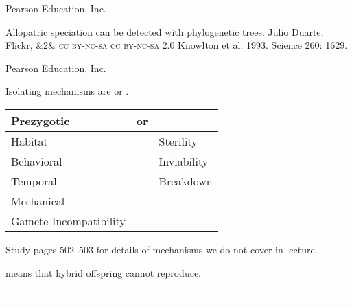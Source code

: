 \documentclass[t]{beamer}
\newcommand{\ccbyncsa}[1]{%
	\ifx&#1&
	{\textsc{cc by-nc-sa}}%
\else
	{\textsc{cc by-nc-sa #1.0}}
\fi}
\begin{document}
{
\begin{frame}[b]
\hfill \tiny \textcopyright Pearson Education, Inc.
\end{frame}
}

{
\begin{frame}[b]{Allopatric speciation can be detected with phylogenetic trees.}
\tiny  Julio Duarte, Flickr, \ccbyncsa{2} \hfill Knowlton et al. 1993. Science 260: 1629.
\end{frame}
}

{
\begin{frame}[b]
\tiny  \textcopyright Pearson Education, Inc.
\end{frame}
}

\begin{frame}{Isolating mechanisms are  or .}
	\vspace{2\baselineskip}
	\centering
	\begin{tabular}{l l l}
	\toprule
	{\large Prezygotic}	& or &	{\large \highlight{Postzygotic}}\\
	\midrule
	Habitat	& & Sterility \\
	Behavioral & &	Inviability \\
	Temporal	& &	Breakdown \\
	Mechanical 	& & 	\\
	Gamete Incompatibility	& & \\
	\bottomrule
	\end{tabular}

	\hangpara Study pages 502--503 for details of mechanisms we do not cover in lecture.
\end{frame}

{
\begin{frame}[b]{ means that hybrid offspring cannot reproduce.}
\hfill \tiny\textcolor{white}{\textcopyright Pearson Education, Inc.}
\end{frame}
}


{
\begin{frame}[b]{}
\hfill \tiny\textcolor{white}{\textcopyright Sinauer Associates, Inc.}
\end{frame}
}
\end{document}
